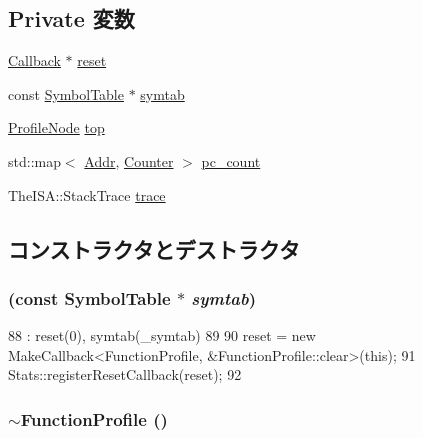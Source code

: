 \subsection*{Private 変数}
\begin{DoxyCompactItemize}
\item 
\hyperlink{classCallback}{Callback} $\ast$ \hyperlink{classFunctionProfile_a0ed28bbd12f6ccb6cb1d367c6078cdb4}{reset}
\item 
const \hyperlink{classSymbolTable}{SymbolTable} $\ast$ \hyperlink{classFunctionProfile_afc2455c41183c75b789c6f4135d13eb5}{symtab}
\item 
\hyperlink{classProfileNode}{ProfileNode} \hyperlink{classFunctionProfile_a00dff89330b641ca394fe1763d98a156}{top}
\item 
std::map$<$ \hyperlink{base_2types_8hh_af1bb03d6a4ee096394a6749f0a169232}{Addr}, \hyperlink{base_2types_8hh_ae1475755791765b8e6f6a8bb091e273e}{Counter} $>$ \hyperlink{classFunctionProfile_a89a94d86887ffe0099680979bb27513b}{pc\_\-count}
\item 
TheISA::StackTrace \hyperlink{classFunctionProfile_a0b590bcf103e321ac16f6b062981fb52}{trace}
\end{DoxyCompactItemize}


\subsection{コンストラクタとデストラクタ}
\hypertarget{classFunctionProfile_a86b4c0d5aba6c081cfe3e83cf5875013}{
\subsubsection[{FunctionProfile}]{ (const SymbolTable $\ast$ {\em symtab})}}
\label{classFunctionProfile_a86b4c0d5aba6c081cfe3e83cf5875013}



\begin{DoxyCode}
88     : reset(0), symtab(_symtab)
89 {
90     reset = new MakeCallback<FunctionProfile, &FunctionProfile::clear>(this);
91     Stats::registerResetCallback(reset);
92 }
\end{DoxyCode}
\hypertarget{classFunctionProfile_a088d30b266fc763d990ad210389c4dc9}{
\subsubsection[{$\sim$FunctionProfile}]{\setlength{\rightskip}{0pt plus 5cm}$\sim${\bf FunctionProfile} ()}}
\label{classFunctionProfile_a088d30b266fc763d990ad210389c4dc9}



